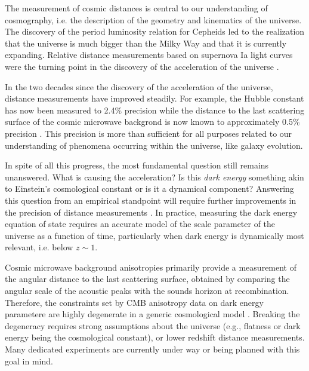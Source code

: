 The measurement of cosmic distances is central to our understanding of
cosmography, i.e. the description of the geometry and kinematics of
the universe. The discovery of the period luminosity relation for
Cepheids led to the realization that the universe is much bigger than
the Milky Way and that it is currently expanding. Relative distance
measurements based on supernova Ia light curves were the turning point
in the discovery of the acceleration of the universe
\citep{Riess:1998p21184,Per++99}.

In the two decades since the discovery of the acceleration of the
universe, distance measurements have improved steadily. For example,
the Hubble constant has now been measured to 2.4\% precision
\citep{Rie++16} while the distance to the last scattering surface of
the cosmic microwave backgrond is now known to approximately 0.5\%
precision \citep[depending on the assumed cosmological
model]{WMAP9,Pla15}. This precision is more than sufficient for all
purposes related to our understanding of phenomena occurring within
the universe, like galaxy evolution.

In spite of all this progress, the most fundamental question still
remains unanswered. What is causing the acceleration? Is this {\it
dark energy} something akin to Einstein's cosmological constant or is
it a dynamical component? Answering this question from an empirical
standpoint will require further improvements in the precision of
distance measurements \citep{Suy++12,Wei++13,Kim++15,Rie++16}.  In
practice, measuring the dark energy equation of state requires an
accurate model of the scale parameter of the universe as a function of
time, particularly when dark energy is dynamically most relevant,
i.e. below $z\sim1$.

Cosmic microwave background anisotropies primarily provide a
measurement of the angular distance to the last scattering surface,
obtained by comparing the angular scale of the acoustic peaks with the
sounds horizon at recombination. Therefore, the constraints set by CMB
anisotropy data on dark energy parametere are highly degenerate in a
generic cosmological model
\citep[e.g.,][]{Pla15}. Breaking the degeneracy requires strong
assumptions about the universe (e.g., flatness or dark energy being
the cosmological constant), or lower redshift distance
measurements. Many dedicated experiments are currently under way or
being planned with this goal in mind.


